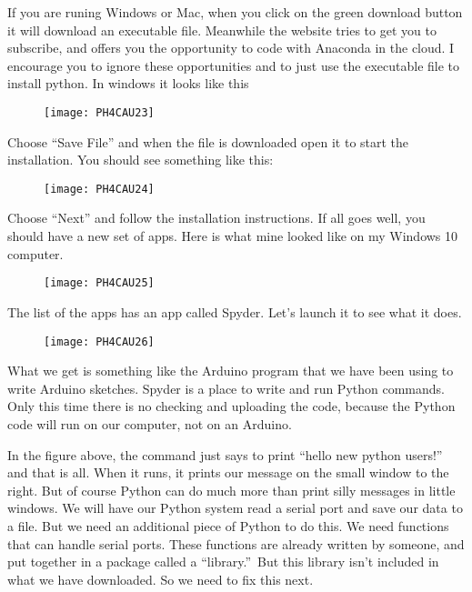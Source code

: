 If you are runing Windows or Mac, when you click on the green download button it will download an executable file. Meanwhile the website tries to get you to subscribe, and offers you the opportunity to code with Anaconda in the cloud. I encourage you to ignore these opportunities and to just use the executable file to install python. In windows it looks like this 

\begin{figure}[h!]
	\centering
	\texttt{[image: PH4CAU23]}
\end{figure}

Choose ``Save File'' and when the file is downloaded open it to start the installation. You should see something like this: 

\begin{figure}[h!]
	\centering
	\texttt{[image: PH4CAU24]}
\end{figure}

Choose ``Next'' and follow the installation instructions. If all goes well, you should have a new set of apps. Here is what mine looked like on my Windows 10 computer. 

\begin{figure}[h!]
	\centering
	\texttt{[image: PH4CAU25]}
\end{figure}

The list of the apps has an app called Spyder. Let's launch it to see what it does.

\begin{figure}[h!]
	\centering
	\texttt{[image: PH4CAU26]}
\end{figure}

What we get is something like the Arduino program that we have been using to write Arduino sketches. Spyder is a place to write and run Python commands. Only this time there is no checking and uploading the code, because the Python code will run on our computer, not on an Arduino.

In the figure above, the command just says to print ``hello new python users!'' and that is all. When it runs, it prints our message on the small window to the right. But of course Python
can do much more than print silly messages in little windows. We will have our Python system read a serial port and save our data to a file. But we need an additional piece of Python to do this. We need functions that can handle serial ports. These functions are already written by someone, and put together in a package called a \textquotedblleft library.\textquotedblright\
But this library isn't included in what we have downloaded. So we need to fix this next.

